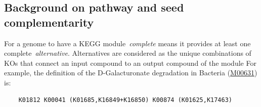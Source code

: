 \documentclass[sn-mathphys,Numbered]{sn-jnl}  %
\theoremstyle{thmstyleone}%
\theoremstyle{thmstyletwo}%
\theoremstyle{thmstylethree}%
\begin{document}
\begin{appendices}













    \section{Background on pathway and seed complementarity}
    \label{app:pathcompl}

        For a genome to have a KEGG module~\textit{complete} means it provides at least one complete~\textit{alternative}.
        Alternatives are considered as the unique combinations of KOs that connect an input compound to an output compound of the module 
        For example, the definition of the D-Galacturonate degradation in Bacteria (\href{https://www.genome.jp/dbget-bin/www_bget?M00631}{M00631}) is:
        \bigskip
        \begin{verbatim}    K01812 K00041 (K01685,K16849+K16850) K00874 (K01625,K17463)\end{verbatim}
        \bigskip
        

\end{appendices}
\end{document}

